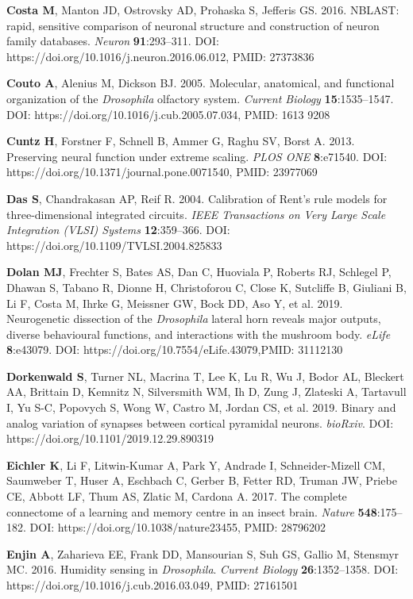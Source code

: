 \documentclass{article}
\begin{document}
\begin{hangpars}
\textbf{Costa M}, Manton JD, Ostrovsky AD, Prohaska S, Jefferis GS. 2016. NBLAST: rapid, sensitive comparison of neuronal structure and construction of neuron family databases. \emph{Neuron} \textbf{91}:293–311. DOI: https://doi.org/10.1016/j.neuron.2016.06.012, PMID: 27373836

\textbf{Couto A}, Alenius M, Dickson BJ. 2005. Molecular, anatomical, and functional organization of the \emph{Drosophila} olfactory system. \emph{Current Biology} \textbf{15}:1535–1547. DOI: https://doi.org/10.1016/j.cub.2005.07.034, PMID: 1613 9208

\textbf{Cuntz H}, Forstner F, Schnell B, Ammer G, Raghu SV, Borst A. 2013. Preserving neural function under extreme scaling. \emph{PLOS ONE} \textbf{8}:e71540. DOI: https://doi.org/10.1371/journal.pone.0071540, PMID: 23977069

\textbf{Das S}, Chandrakasan AP, Reif R. 2004. Calibration of Rent’s rule models for three-dimensional integrated circuits. \emph{IEEE Transactions on Very Large Scale Integration (VLSI) Systems} \textbf{12}:359–366. DOI: https://doi.org/10.1109/TVLSI.2004.825833

\textbf{Dolan MJ}, Frechter S, Bates AS, Dan C, Huoviala P, Roberts RJ, Schlegel P, Dhawan S, Tabano R, Dionne H, Christoforou C, Close K, Sutcliffe B, Giuliani B, Li F, Costa M, Ihrke G, Meissner GW, Bock DD, Aso Y, et al. 2019. Neurogenetic dissection of the \emph{Drosophila} lateral horn reveals major outputs, diverse behavioural functions, and interactions with the mushroom body. \emph{eLife} \textbf{8}:e43079. DOI: https://doi.org/10.7554/eLife.43079,PMID: 31112130

\textbf{Dorkenwald S}, Turner NL, Macrina T, Lee K, Lu R, Wu J, Bodor AL, Bleckert AA, Brittain D, Kemnitz N, Silversmith WM, Ih D, Zung J, Zlateski A, Tartavull I, Yu S-C, Popovych S, Wong W, Castro M, Jordan CS, et al. 2019. Binary and analog variation of synapses between cortical pyramidal neurons. \emph{bioRxiv}. DOI: https://doi.org/10.1101/2019.12.29.890319

\textbf{Eichler K}, Li F, Litwin-Kumar A, Park Y, Andrade I, Schneider-Mizell CM, Saumweber T, Huser A, Eschbach C, Gerber B, Fetter RD, Truman JW, Priebe CE, Abbott LF, Thum AS, Zlatic M, Cardona A. 2017. The complete connectome of a learning and memory centre in an insect brain. \emph{Nature} \textbf{548}:175–182. DOI: https://doi.org/10.1038/nature23455, PMID: 28796202

\textbf{Enjin A}, Zaharieva EE, Frank DD, Mansourian S, Suh GS, Gallio M, Stensmyr MC. 2016. Humidity sensing in \emph{Drosophila}. \emph{Current Biology} \textbf{26}:1352–1358. DOI: https://doi.org/10.1016/j.cub.2016.03.049, PMID: 27161501


\end{hangpars}
\end{document}
